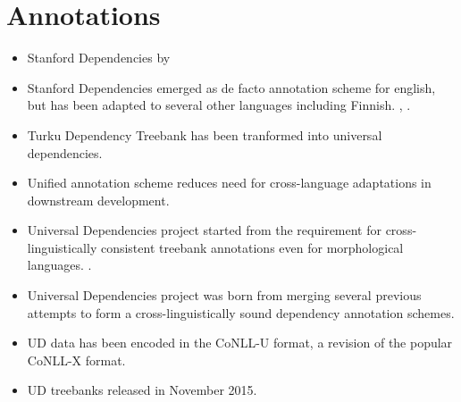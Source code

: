 \documentclass[12pt,a4paper,english
]{tutthesis}
\begin{document}
\section{Annotations}
\label{se:annotations}
\begin{itemize}
\item Stanford Dependencies by \cite{DeMarneffe2006}
\item Stanford Dependencies emerged as de facto annotation scheme for english, but has been adapted to several other languages including Finnish. \cite{Nivre2016}, \cite{Haverinen2014}.
\item Turku Dependency Treebank has been tranformed into universal dependencies. \cite{Pyysalo2015}
\item Unified annotation scheme reduces need for cross-language adaptations in downstream development. \cite{Petrov2012}
\item Universal Dependencies project started from the requirement for cross-linguistically consistent treebank annotations even for morphological languages. \cite{Nivre2016}.
\item Universal Dependencies project was born from merging several previous attempts to form a cross-linguistically sound dependency annotation schemes. \cite{Nivre2016}
\item UD data has been encoded in the CoNLL-U format, a revision of the popular CoNLL-X format. \cite{Nivre2016}
\item UD treebanks released in November 2015. \cite{Nivre2016}
\end{itemize}
\end{document}
